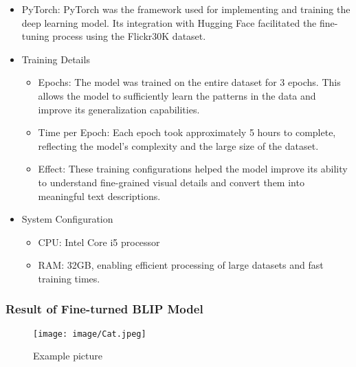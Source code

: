 \documentclass[conference]{IEEEtran}
\begin{document}
\begin{itemize}
    \item PyTorch: PyTorch was the framework used for implementing and training the deep learning model. Its integration with Hugging Face facilitated the fine-tuning process using the Flickr30K dataset.\\
\end{itemize}

\begin{itemize}
    \item Training Details
\begin{itemize}
    \item Epochs: The model was trained on the entire dataset for 3 epochs. This allows the model to sufficiently learn the patterns in the data and improve its generalization capabilities.\\
    \item Time per Epoch: Each epoch took approximately 5 hours to complete, reflecting the model's complexity and the large size of the dataset.\\
    \item Effect: These training configurations helped the model improve its ability to understand fine-grained visual details and convert them into meaningful text descriptions.\\
\end{itemize}
\end{itemize}

\begin{itemize}
    \item System Configuration
\begin{itemize}
    \item CPU: Intel Core i5 processor\\
    \item RAM: 32GB, enabling efficient processing of large datasets and fast training times.\\
\end{itemize}
\end{itemize}



\clearpage

\subsubsection{Result of Fine-turned BLIP Model}
\begin{figure}[h!]
    \centering
    \texttt{[image: image/Cat.jpeg]}
    \caption{Example picture}
    \label{fig:enter-label}
\end{figure}
\end{document}
